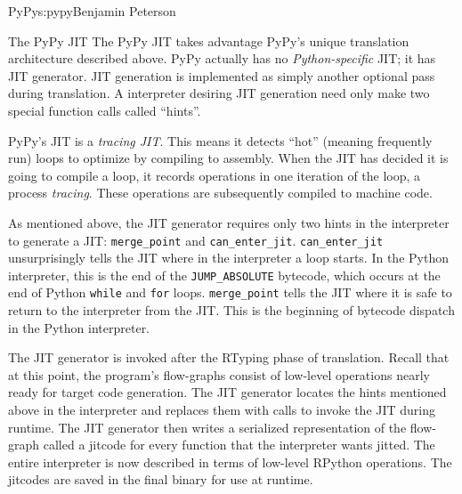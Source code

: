 \begin{aosachapter}{PyPy}{s:pypy}{Benjamin Peterson}
\begin{aosasect1}{The PyPy JIT}
The PyPy JIT takes advantage PyPy's unique translation architecture described
above. PyPy actually has no \emph{Python-specific} JIT; it has JIT
generator. JIT generation is implemented as simply another optional pass during
translation. A interpreter desiring JIT generation need only make two special
function calls called ``hints''.

PyPy's JIT is a \emph{tracing JIT}. This means it detects ``hot'' (meaning
frequently run) loops to optimize by compiling to assembly. When the JIT has
decided it is going to compile a loop, it records operations in one iteration of
the loop, a process \emph{tracing}. These operations are subsequently compiled
to machine code.

As mentioned above, the JIT generator requires only two hints in the interpreter
to generate a JIT: \verb+merge_point+ and
\verb+can_enter_jit+. \verb+can_enter_jit+ unsurprisingly tells the JIT where in
the interpreter a loop starts. In the Python interpreter, this is the end of the
\verb+JUMP_ABSOLUTE+ bytecode, which occurs at the end of Python \verb+while+
and \verb+for+ loops. \verb+merge_point+ tells the JIT where it is safe to
return to the interpreter from the JIT. This is the beginning of bytecode
dispatch in the Python interpreter.

The JIT generator is invoked after the RTyping phase of translation. Recall that
at this point, the program's flow-graphs consist of low-level operations nearly
ready for target code generation. The JIT generator locates the hints mentioned
above in the interpreter and replaces them with calls to invoke the JIT during
runtime. The JIT generator then writes a serialized representation of the
flow-graph called a jitcode for every function that the interpreter wants
jitted. The entire interpreter is now described in terms of low-level RPython
operations. The jitcodes are saved in the final binary for use at runtime.


\end{aosasect1}
\end{aosachapter}
